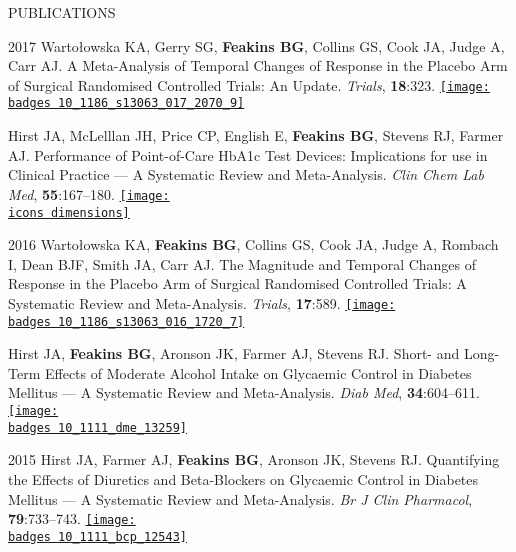 \documentclass[10pt,a4paper]{article}
\def\badges{./badges/}
\def\icons{./icons/}
\begin{document}
\begin{cvlist}{PUBLICATIONS}
  \item[2017]
  Warto\l{}owska KA, Gerry SG, \textbf{Feakins BG}, Collins GS, Cook JA, Judge A, Carr AJ. A Meta-Analysis of Temporal Changes of Response in the Placebo Arm of Surgical Randomised Controlled Trials: An Update. \textit{Trials}, \textbf{18}:323.  \href{https://biomedcentral.altmetric.com/details/21804060}{\texttt{[image: \\badges 10\_1186\_s13063\_017\_2070\_9]}}
  
  \item[]
  Hirst JA, McLelllan JH, Price CP, English E, \textbf{Feakins BG}, Stevens RJ, Farmer AJ. Performance of Point-of-Care HbA1c Test Devices: Implications for use in Clinical Practice --- A Systematic Review and Meta-Analysis. \textit{Clin Chem Lab Med}, \textbf{55}:167--180.  \href{https://badge.dimensions.ai/details/id/pub.1036082624}{\texttt{[image: \\icons dimensions]}}
  
  \item[2016]
  Warto\l{}owska KA, \textbf{Feakins BG}, Collins GS, Cook JA, Judge A, Rombach I, Dean BJF, Smith JA, Carr AJ. The Magnitude and Temporal Changes of Response in the Placebo Arm of Surgical Randomised Controlled Trials: A Systematic Review and Meta-Analysis. \textit{Trials}, \textbf{17}:589.  \href{https://biomedcentral.altmetric.com/details/14679542}{\texttt{[image: \\badges 10\_1186\_s13063\_016\_1720\_7]}}
  
  \item[]
  Hirst JA, \textbf{Feakins BG}, Aronson JK, Farmer AJ, Stevens RJ. Short- and Long-Term Effects of Moderate Alcohol Intake on Glycaemic Control in Diabetes Mellitus --- A Systematic Review and Meta-Analysis. \textit{Diab Med}, \textbf{34}:604--611.  \href{https://wiley.altmetric.com/details/11898077}{\texttt{[image: \\badges 10\_1111\_dme\_13259]}}
  
  \item[2015]
  Hirst JA, Farmer AJ, \textbf{Feakins BG}, Aronson JK, Stevens RJ. Quantifying the Effects of Diuretics and Beta-Blockers on Glycaemic Control in Diabetes Mellitus --- A Systematic Review and Meta-Analysis. \textit{Br J Clin Pharmacol}, \textbf{79}:733--743.  \href{https://wiley.altmetric.com/details/2869563}{\texttt{[image: \\badges 10\_1111\_bcp\_12543]}}
  
\end{cvlist}
\end{document}
